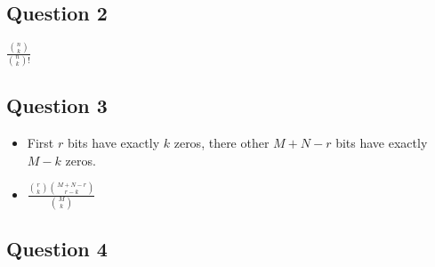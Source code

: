 \documentclass[12pt]{article}
\begin{document}

\subsection{Question 2}

$\displaystyle \frac{\binom{n}{k}}{\binom{n}{k}!}$



\subsection{Question 3}

\begin{itemize}
  \item First $r$ bits have exactly $k$ zeros,
	 there other $M+N-r$ bits have exactly $M-k$ zeros.
  \item $\displaystyle \frac{\binom{r}{k} \binom{M+N-r}{r-k}} {\binom{M}{k}} $
\end{itemize}



\subsection{Question 4}
\end{document}
